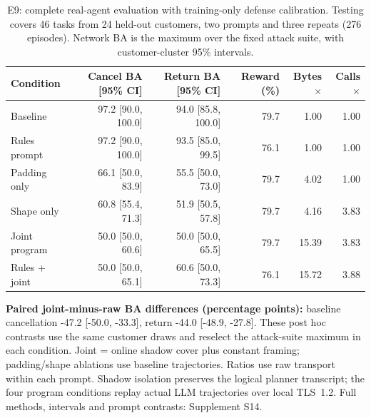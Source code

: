 \begin{table}[t]\centering\small
\caption{E9: complete real-agent evaluation with training-only defense calibration. Testing covers 46 tasks from 24 held-out customers, two prompts and three repeats (276 episodes). Network BA is the maximum over the fixed attack suite, with customer-cluster 95\% intervals.}\label{tab:r4-primary}
\begin{tabular}{@{}lrrrrr@{}}\toprule
Condition & Cancel BA [95\% CI] & Return BA [95\% CI] & Reward (\%) & Bytes$\times$ & Calls$\times$\\\midrule
Baseline & 97.2 [90.0, 100.0] & 94.0 [85.8, 100.0] & 79.7 & 1.00 & 1.00\\
Rules prompt & 97.2 [90.0, 100.0] & 93.5 [85.0, 99.5] & 76.1 & 1.00 & 1.00\\
Padding only & 66.1 [50.0, 83.9] & 55.5 [50.0, 73.0] & 79.7 & 4.02 & 1.00\\
Shape only & 60.8 [55.4, 71.3] & 51.9 [50.5, 57.8] & 79.7 & 4.16 & 3.83\\
Joint program & 50.0 [50.0, 60.6] & 50.0 [50.0, 65.5] & 79.7 & 15.39 & 3.83\\
Rules + joint & 50.0 [50.0, 65.1] & 60.6 [50.0, 73.3] & 76.1 & 15.72 & 3.88\\
\bottomrule\end{tabular}
\par\smallskip\raggedright \textbf{Paired joint-minus-raw BA differences (percentage points):} baseline cancellation -47.2 [-50.0, -33.3], return -44.0 [-48.9, -27.8]. These post hoc contrasts use the same customer draws and reselect the attack-suite maximum in each condition. Joint = online shadow cover plus constant framing; padding/shape ablations use baseline trajectories. Ratios use raw transport within each prompt. Shadow isolation preserves the logical planner transcript; the four program conditions replay actual LLM trajectories over local TLS~1.2. Full methods, intervals and prompt contrasts: Supplement S14.
\end{table}
